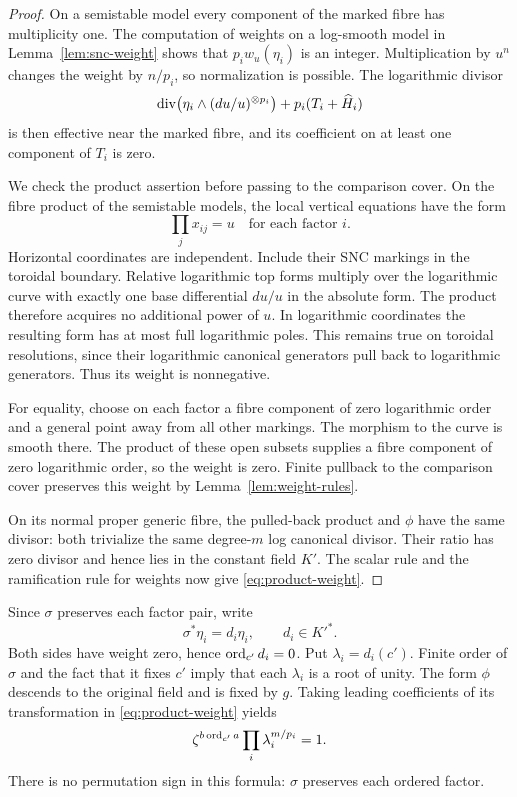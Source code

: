 \begin{proof}
On a semistable model every component of the marked fibre has
multiplicity one. The computation of weights on a log-smooth model
in Lemma~\ref{lem:snc-weight} shows that $p_iw_u(\eta_i)$ is an
integer. Multiplication by $u^n$ changes the weight by $n/p_i$, so
normalization is possible. The logarithmic divisor
\[
 \operatorname{div}\bigl(\eta_i\wedge(du/u)^{\otimes p_i}\bigr)
       +p_i(T_i+\widehat H_i)
\]
is then effective near the marked fibre, and its coefficient on at
least one component of $T_i$ is zero.

We check the product assertion before passing to the comparison
cover. On the fibre product of the semistable models, the local
vertical equations have the form
\[
                   \prod_j x_{ij}=u
                    \quad\text{for each factor }i.
\]
Horizontal coordinates are independent. Include their SNC markings
in the toroidal boundary. Relative logarithmic top forms multiply
over the logarithmic curve with exactly one base differential
$du/u$ in the absolute form. The product therefore acquires no
additional power of $u$. In logarithmic coordinates the resulting
form has at most full logarithmic poles. This remains true on
toroidal resolutions, since their logarithmic canonical generators
pull back to logarithmic generators. Thus its weight is nonnegative.

For equality, choose on each factor a fibre component of zero
logarithmic order and a general point away from all other markings.
The morphism to the curve is smooth there. The product of these
open subsets supplies a fibre component of zero logarithmic order,
so the weight is zero. Finite pullback to the comparison cover
preserves this weight by Lemma~\ref{lem:weight-rules}.

On its normal proper generic fibre, the pulled-back product and
$\phi$ have the same divisor: both trivialize the same degree-$m$
log canonical divisor. Their ratio has zero divisor and hence lies
in the constant field $K'$. The scalar rule and the ramification
rule for weights now give \eqref{eq:product-weight}.
\end{proof}

Since $\sigma$ preserves each factor pair, write
\[
 \sigma^*\eta_i=d_i\eta_i,\qquad d_i\in K'^*.
\]
Both sides have weight zero, hence $\operatorname{ord}_{c'}d_i=0$. Put
$\lambda_i=d_i(c')$. Finite order of $\sigma$ and the fact that it
fixes $c'$ imply that each $\lambda_i$ is a root of unity.
The form $\phi$ descends to the original field and is fixed by $g$.
Taking leading coefficients of its transformation in
\eqref{eq:product-weight} yields
\begin{equation}\label{eq:character-cancellation}
              \zeta^{b\operatorname{ord}_{c'}a}
                       \prod_i\lambda_i^{m/p_i}=1.
\end{equation}
There is no permutation sign in this formula: $\sigma$ preserves
each ordered factor.

